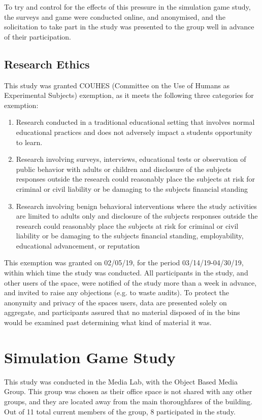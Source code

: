 \documentclass[nofonts,nols,justified,nobib]{tufte-book}
\begin{document}
To try and control for the effects of this pressure in the simulation game study, the surveys and game were conducted online, and anonymised, and the solicitation to take part in the study was presented to the group well in advance of their participation.

\subsection*{Research Ethics}
This study was granted COUHES (Committee on the Use of Humans as Experimental Subjects) exemption, as it meets the following three categories for exemption:

\begin{enumerate}
  \item Research conducted in a traditional educational setting that involves normal educational practices and does not adversely impact a students opportunity to learn.
  \item Research involving surveys, interviews, educational tests or observation of public behavior with adults or children and disclosure of the subjects responses outside the research could reasonably place the subjects at risk for criminal or civil liability or be damaging to the subjects financial standing
  \item Research involving benign behavioral interventions where the study activities are limited to adults only and disclosure of the subjects responses outside the research could reasonably place the subjects at risk for criminal or civil liability or be damaging to the subjects financial standing, employability, educational advancement, or reputation
\end{enumerate}

This exemption was granted on 02/05/19, for the period 03/14/19-04/30/19, within which time the study was conducted. All participants in the study, and other users of the space, were notified of the study more than a week in advance, and invited to raise any objections (e.g. to waste audits). To protect the anonymity and privacy of the spaces users, data are presented solely on aggregate, and participants assured that no material disposed of in the bins would be examined past determining what kind of material it was.

\section*{Simulation Game Study}
This study was conducted in the Media Lab, with the Object Based Media Group. This group was chosen as their office space is not shared with any other groups, and they are located away from the main thoroughfares of the building. Out of 11 total current members of the group, 8 participated in the study.
\end{document}
